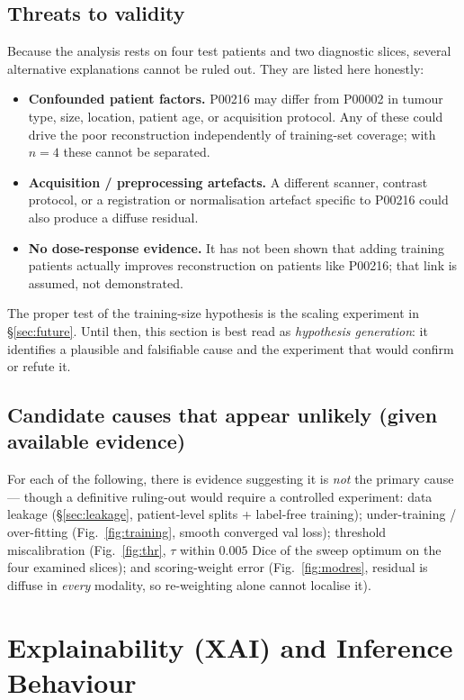 \documentclass[12pt, a4paper]{article}
\theoremstyle{definition}\newtheorem{definition}{Definition}
\begin{document}
\subsection{Threats to validity}
Because the analysis rests on four test patients and two diagnostic slices, several
alternative explanations cannot be ruled out. They are listed here honestly:
\begin{itemize}[leftmargin=1.4em,itemsep=1pt]
\item \textbf{Confounded patient factors.} P00216 may differ from P00002 in tumour type,
size, location, patient age, or acquisition protocol. Any of these could drive the poor
reconstruction independently of training-set coverage; with $n=4$ these cannot be
separated.
\item \textbf{Acquisition / preprocessing artefacts.} A different scanner, contrast
protocol, or a registration or normalisation artefact specific to P00216 could also
produce a diffuse residual.
\item \textbf{No dose-response evidence.} It has not been shown that adding training
patients actually improves reconstruction on patients like P00216; that link is assumed,
not demonstrated.
\end{itemize}
The proper test of the training-size hypothesis is the scaling experiment in
\S\ref{sec:future}. Until then, this section is best read as \emph{hypothesis
generation}: it identifies a plausible and falsifiable cause and the experiment that
would confirm or refute it.

\subsection{Candidate causes that appear unlikely (given available evidence)}
For each of the following, there is evidence suggesting it is \emph{not} the primary
cause --- though a definitive ruling-out would require a controlled experiment:
data leakage (\S\ref{sec:leakage}, patient-level splits + label-free training);
under-training / over-fitting (Fig.~\ref{fig:training}, smooth converged val loss);
threshold miscalibration (Fig.~\ref{fig:thr}, $\tau$ within $0.005$ Dice of
the sweep optimum on the four examined slices); and scoring-weight error
(Fig.~\ref{fig:modres}, residual is diffuse in \emph{every} modality, so
re-weighting alone cannot localise it).

\section{Explainability (XAI) and Inference Behaviour}
\label{sec:xai}
\end{document}
